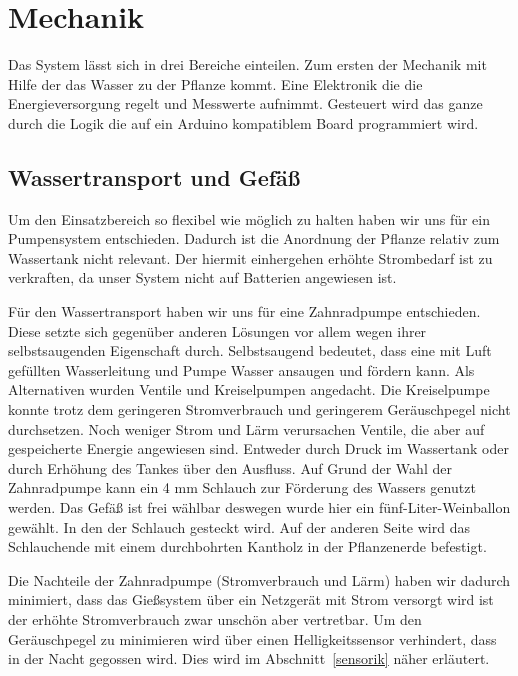 \documentclass[]{IEEEtran}
\begin{document}
\section{Mechanik}
Das System lässt sich in drei Bereiche einteilen. Zum ersten der Mechanik mit Hilfe der das Wasser zu der Pflanze kommt. Eine Elektronik die die Energieversorgung regelt und Messwerte aufnimmt. Gesteuert wird das ganze durch die Logik die auf ein Arduino kompatiblem Board programmiert wird.
\subsection{Wassertransport und Gefäß}
Um den Einsatzbereich so flexibel wie möglich zu halten haben wir uns für ein Pumpensystem entschieden. Dadurch ist die Anordnung der Pflanze relativ zum Wassertank nicht relevant. Der hiermit einhergehen erhöhte Strombedarf ist zu verkraften, da unser System nicht auf Batterien angewiesen ist.
	
Für den Wassertransport haben wir uns für eine Zahnradpumpe entschieden.
Diese setzte sich gegenüber anderen Lösungen vor allem wegen ihrer selbstsaugenden Eigenschaft durch.
Selbstsaugend bedeutet, dass eine mit Luft gefüllten Wasserleitung und Pumpe Wasser ansaugen und fördern kann. Als Alternativen wurden Ventile und Kreiselpumpen angedacht.
Die Kreiselpumpe konnte trotz dem geringeren Stromverbrauch und geringerem Geräuschpegel nicht durchsetzen. 
Noch weniger Strom und Lärm verursachen Ventile, die aber auf gespeicherte Energie angewiesen sind.  Entweder durch Druck im Wassertank oder durch Erhöhung des Tankes über den Ausfluss. 
Auf Grund der Wahl der Zahnradpumpe kann ein 4 mm Schlauch zur Förderung des Wassers genutzt werden. Das Gefäß ist frei wählbar deswegen wurde hier ein fünf-Liter-Weinballon gewählt. 
 In den der Schlauch gesteckt wird. Auf der anderen Seite wird das Schlauchende mit einem durchbohrten Kantholz in der Pflanzenerde befestigt.
	
	Die Nachteile der Zahnradpumpe (Stromverbrauch und Lärm) haben wir dadurch minimiert, dass das Gießsystem über ein Netzgerät mit Strom versorgt wird ist der erhöhte Stromverbrauch zwar unschön aber vertretbar. Um den Geräuschpegel zu minimieren wird über einen Helligkeitssensor verhindert, dass in der Nacht gegossen wird. Dies wird im Abschnitt~\ref{sensorik} näher erläutert.
	
\end{document}
